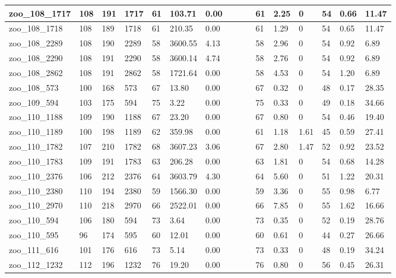 \begin{landscape}
\begin{longtable}{llllllllllllllll}
zoo\_108\_1717 & 108 & 191 & 1717 & 61 & 103.71 & 0.00 &  &  &  & 61 & 2.25 & 0 & 54 & 0.66 & 11.47 \\ \hline 
zoo\_108\_1718 & 108 & 189 & 1718 & 61 & 210.35 & 0.00 &  &  &  & 61 & 1.29 & 0 & 54 & 0.65 & 11.47 \\ \hline 
zoo\_108\_2289 & 108 & 190 & 2289 & 58 & 3600.55 & 4.13 &  &  &  & 58 & 2.96 & 0 & 54 & 0.92 & 6.89 \\ \hline 
zoo\_108\_2290 & 108 & 191 & 2290 & 58 & 3600.14 & 4.74 &  &  &  & 58 & 2.76 & 0 & 54 & 0.92 & 6.89 \\ \hline 
zoo\_108\_2862 & 108 & 191 & 2862 & 58 & 1721.64 & 0.00 &  &  &  & 58 & 4.53 & 0 & 54 & 1.20 & 6.89 \\ \hline 
zoo\_108\_573 & 100 & 168 & 573 & 67 & 13.80 & 0.00 &  &  &  & 67 & 0.32 & 0 & 48 & 0.17 & 28.35 \\ \hline 
zoo\_109\_594 & 103 & 175 & 594 & 75 & 3.22 & 0.00 &  &  &  & 75 & 0.33 & 0 & 49 & 0.18 & 34.66 \\ \hline 
zoo\_110\_1188 & 109 & 190 & 1188 & 67 & 23.20 & 0.00 &  &  &  & 67 & 0.80 & 0 & 54 & 0.46 & 19.40 \\ \hline 
zoo\_110\_1189 & 100 & 198 & 1189 & 62 & 359.98 & 0.00 &  &  &  & 61 & 1.18 & 1.61 & 45 & 0.59 & 27.41 \\ \hline 
zoo\_110\_1782 & 107 & 210 & 1782 & 68 & 3607.23 & 3.06 &  &  &  & 67 & 2.80 & 1.47 & 52 & 0.92 & 23.52 \\ \hline 
zoo\_110\_1783 & 109 & 191 & 1783 & 63 & 206.28 & 0.00 &  &  &  & 63 & 1.81 & 0 & 54 & 0.68 & 14.28 \\ \hline 
zoo\_110\_2376 & 106 & 212 & 2376 & 64 & 3603.79 & 4.30 &  &  &  & 64 & 5.60 & 0 & 51 & 1.22 & 20.31 \\ \hline 
zoo\_110\_2380 & 110 & 194 & 2380 & 59 & 1566.30 & 0.00 &  &  &  & 59 & 3.36 & 0 & 55 & 0.98 & 6.77 \\ \hline 
zoo\_110\_2970 & 110 & 218 & 2970 & 66 & 2522.01 & 0.00 &  &  &  & 66 & 7.85 & 0 & 55 & 1.62 & 16.66 \\ \hline 
zoo\_110\_594 & 106 & 180 & 594 & 73 & 3.64 & 0.00 &  &  &  & 73 & 0.35 & 0 & 52 & 0.19 & 28.76 \\ \hline 
zoo\_110\_595 & 96 & 174 & 595 & 60 & 12.01 & 0.00 &  &  &  & 60 & 0.61 & 0 & 44 & 0.27 & 26.66 \\ \hline 
zoo\_111\_616 & 101 & 176 & 616 & 73 & 5.14 & 0.00 &  &  &  & 73 & 0.33 & 0 & 48 & 0.19 & 34.24 \\ \hline 
zoo\_112\_1232 & 112 & 196 & 1232 & 76 & 19.20 & 0.00 &  &  &  & 76 & 0.80 & 0 & 56 & 0.45 & 26.31 \\ \hline 

\end{longtable}
\end{landscape}
